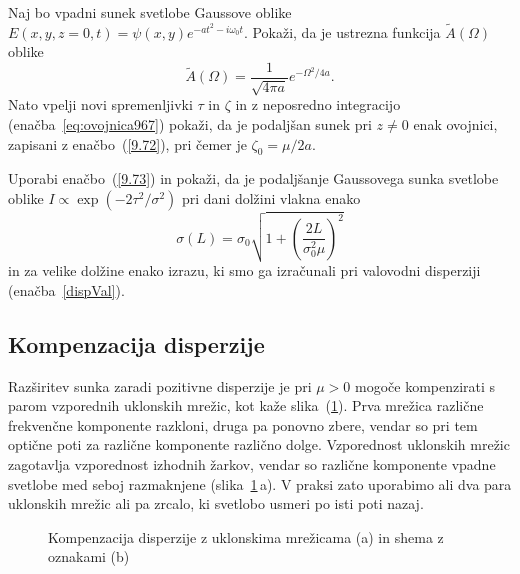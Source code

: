\begin{definition}
\label{naloga:pulzdisperzija}
Naj bo vpadni sunek svetlobe Gaussove oblike $E(x,y, z=0, t) = 
\psi(x,y) e^{-at^2-i \omega_0 t}$. Pokaži, da je ustrezna funkcija
$\tilde{A}(\Omega)$ oblike
\begin{equation}
\tilde{A}(\Omega) = \frac{1}{\sqrt{4 \pi a}}e^{-\Omega^2/4a}.
\end{equation}
Nato vpelji novi spremenljivki $\tau$ in $\zeta$ in z neposredno 
integracijo (enačba~\ref{eq:ovojnica967}) pokaži, 
da je podaljšan sunek pri $z\neq 0$ enak ovojnici, 
zapisani z enačbo~(\ref{9.72}), pri čemer je $\zeta_0 = \mu/2 a$.
\end{definition}

\begin{definition}
Uporabi enačbo~(\ref{9.73}) in pokaži, da je podaljšanje Gaussovega 
sunka svetlobe oblike $I \propto \exp(-2\tau^2/\sigma^2)$
pri dani dolžini vlakna enako
\begin{equation}
\sigma (L) = \sigma_0\sqrt{1 + \left(\frac{2 L }{\sigma_0^2 \mu}\right)^2}
\end{equation}
in za velike dolžine enako izrazu, ki smo ga izračunali pri 
valovodni disperziji (enačba~\ref{dispVal}).
\end{definition}

\subsection*{Kompenzacija disperzije}
\label{kompdisp}
Razširitev sunka zaradi pozitivne disperzije je pri $\mu > 0$ mogoče kompenzirati
s parom vzporednih uklonskih mrežic, kot kaže slika~(\ref{fig:comp}).
Prva mrežica različne frekvenčne komponente razkloni, druga pa ponovno
zbere, vendar so pri tem optične poti za različne komponente različno dolge.
Vzporednost uklonskih mrežic zagotavlja vzporednost izhodnih žarkov,
vendar so različne komponente vpadne svetlobe med seboj razmaknjene (slika~\ref{fig:comp}\,a).
V praksi zato uporabimo ali dva para uklonskih mrežic ali pa 
zrcalo, ki svetlobo usmeri po isti poti nazaj. 
\begin{figure}[h]
\centering
\def\svgwidth{120truemm} 

\caption{Kompenzacija disperzije z uklonskima mrežicama (a) in shema z
oznakami (b)}
\label{fig:comp}
\end{figure}


